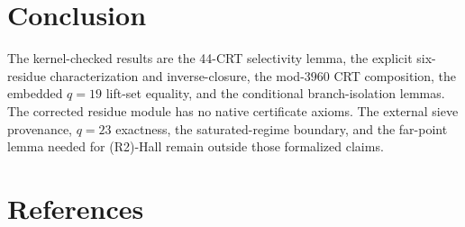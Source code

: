 \documentclass[11pt,a4paper]{article}
\theoremstyle{definition}
\begin{document}
\section{Conclusion}

The kernel-checked results are the 44-CRT selectivity lemma, the
explicit six-residue characterization and inverse-closure, the
mod-$3960$ CRT composition, the embedded $q=19$ lift-set equality,
and the conditional branch-isolation lemmas. The corrected residue
module has no native certificate axioms. The external sieve provenance,
$q=23$ exactness, the saturated-regime boundary, and the far-point
lemma needed for (R2)-Hall remain outside those formalized claims.

\section{References}
\end{document}
